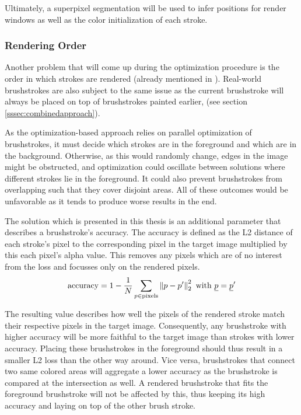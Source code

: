 Ultimately, a superpixel segmentation will be used to infer positions for render windows as well as the color initialization of each stroke.

\subsubsection{Rendering Order}
Another problem that will come up during the optimization procedure is the order in which strokes are rendered (already mentioned in ).
Real-world brushstrokes are also subject to the same issue as the current brushstroke will always be placed on top of brushstrokes painted earlier, (see section \ref{sssec:combinedapproach}).

As the optimization-based approach relies on parallel optimization of brushstrokes, it must decide which strokes are in the foreground and which are in the background.
Otherwise, as this would randomly change, edges in the image might be obstructed, and optimization could oscillate between solutions where different strokes lie in the foreground.
It could also prevent brushstrokes from overlapping such that they cover disjoint areas.
All of these outcomes would be unfavorable as it tends to produce worse results in the end.

The solution which is presented in this thesis is an additional parameter that describes a brushstroke's accuracy.
The accuracy is defined as the L2 distance of each stroke's pixel to the corresponding pixel in the target image multiplied by this each pixel's alpha value.
This removes any pixels which are of no interest from the loss and focusses only on the rendered pixels.
\begin{align}
    \text{accuracy} = 1 - \frac{1}{N} \sum_{p \in \text{pixels}} \left\lVert p - p'\right\rVert_2^2 \text{ with } \underline p = \underline p' 
\end{align}

The resulting value describes how well the pixels of the rendered stroke match their respective pixels in the target image.
Consequently, any brushstroke with higher accuracy will be more faithful to the target image than strokes with lower accuracy.
Placing these brushstrokes in the foreground should thus result in a smaller L2 loss than the other way around.
Vice versa, brushstrokes that connect two same colored areas will aggregate a lower accuracy as the brushstroke is compared at the intersection as well.
A rendered brushstroke that fits the foreground brushstroke will not be affected by this, thus keeping its high accuracy and laying on top of the other brush stroke.


